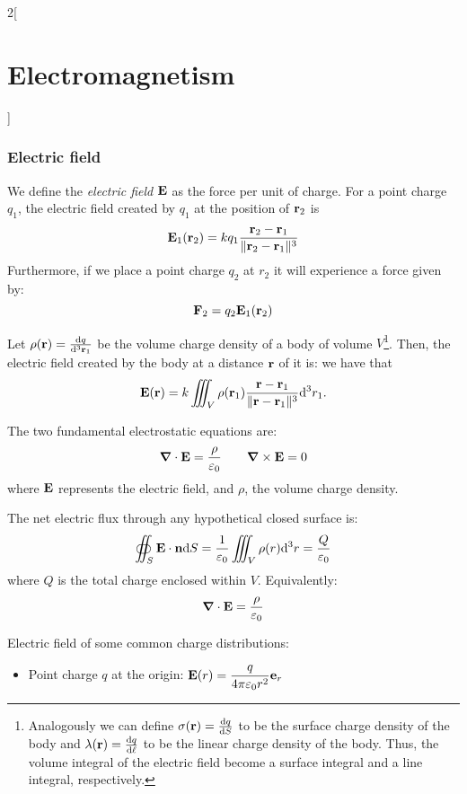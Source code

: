 \documentclass[../../../main.tex]{subfiles}
\begin{document}
\begin{multicols}{2}[\section{Electromagnetism}]
  \subsubsection{Electric field}
  \begin{prop}
    We define the \emph{electric field} $\boldsymbol{\mathrm{E}}$ as the force per unit of charge. For a point charge $q_1$, the electric field created by $q_1$ at the position of $\boldsymbol{\mathrm{r}}_2$ is $$\boldsymbol{\mathrm{E}}_1(\boldsymbol{\mathrm{r}}_2)=kq_1\frac{\boldsymbol{\mathrm{r}}_2-\boldsymbol{\mathrm{r}}_1}{\|\boldsymbol{\mathrm{r}}_2-\boldsymbol{\mathrm{r}}_1\|^3}$$ Furthermore, if we place a point charge $q_2$ at $r_2$ it will experience a force given by: $$\boldsymbol{\mathrm{F}}_2=q_2\boldsymbol{\mathrm{E}}_1(\boldsymbol{\mathrm{r}}_2)$$
  \end{prop}
  \begin{prop}
    Let $\rho(\boldsymbol{\mathrm{r}})=\dv{q}{^3\boldsymbol{\mathrm{r}}_1}$ be the volume charge density of a body of volume $V$\footnote{Analogously we can define $\sigma(\boldsymbol{\mathrm{r}})=\dv{q}{S}$ to be the surface charge density of the body and $\lambda(\boldsymbol{\mathrm{r}})=\dv{q}{\ell}$ to be the linear charge density of the body. Thus, the volume integral of the electric field become a surface integral and a line integral, respectively.}. Then, the electric field created by the body at a distance $\boldsymbol{\mathrm{r}}$ of it is: we have that $$\boldsymbol{\mathrm{E}}(\boldsymbol{\mathrm{r}})=k\iiint_V\rho(\boldsymbol{\mathrm{r}}_1)\frac{\boldsymbol{\mathrm{r}}-\boldsymbol{\mathrm{r}}_1}{\|\boldsymbol{\mathrm{r}}-\boldsymbol{\mathrm{r}}_1\|^3}\dd^3r_1.$$
  \end{prop}
  \begin{theorem}
    The two fundamental electrostatic equations are:
    $$\boldsymbol{\mathrm{\nabla}}\cdot\boldsymbol{\mathrm{E}}=\frac{\rho}{\varepsilon_0}\qquad\boldsymbol{\mathrm{\nabla}}\times\boldsymbol{\mathrm{E}}=0$$
    where $\boldsymbol{\mathrm{E}}$ represents the electric field, and $\rho$, the volume charge density.
  \end{theorem}
  \begin{theorem}
    The net electric flux through any hypothetical closed surface is:
    $$
      \oiint_S\boldsymbol{\mathrm{E}}\cdot\boldsymbol{\mathrm{n}}\dd S=\frac{1}{\varepsilon_0}\iiint_V\rho(r)\dd^3 r=\frac{Q}{\varepsilon_0}
    $$
    where $Q$ is the total charge enclosed within $V$. Equivalently:
    \begin{equation}
      \boldsymbol{\mathrm{\nabla}}\cdot\boldsymbol{\mathrm{E}}=\frac{\rho}{\varepsilon_0}
      \label{E_gauss}
    \end{equation}
  \end{theorem}
  \begin{prop}
    Electric field of some common charge distributions:
    \begin{itemize}
      \item Point charge $q$ at the origin: $\displaystyle \boldsymbol{\mathrm{E}}(r)=\frac{q}{4\pi\varepsilon_0 r^2}\boldsymbol{\mathrm{e}}_r$

\end{itemize}
\end{prop}
\end{multicols}
\end{document}
